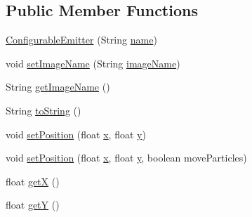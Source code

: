 \subsection*{Public Member Functions}
\begin{DoxyCompactItemize}
\item 
\mbox{\hyperlink{classorg_1_1newdawn_1_1slick_1_1particles_1_1_configurable_emitter_ad86bb9c713312612cc48cf2097a50196}{Configurable\+Emitter}} (String \mbox{\hyperlink{classorg_1_1newdawn_1_1slick_1_1particles_1_1_configurable_emitter_af63b15389d206c6318e14ff4bc909ac0}{name}})
\item 
void \mbox{\hyperlink{classorg_1_1newdawn_1_1slick_1_1particles_1_1_configurable_emitter_aa4bbab57939ae64a1a3fd83704df7065}{set\+Image\+Name}} (String \mbox{\hyperlink{classorg_1_1newdawn_1_1slick_1_1particles_1_1_configurable_emitter_a912693fc97b59864d7ee322ad4f6ec17}{image\+Name}})
\item 
String \mbox{\hyperlink{classorg_1_1newdawn_1_1slick_1_1particles_1_1_configurable_emitter_a7bf7f9630e0c8ca6a2903da8128d325f}{get\+Image\+Name}} ()
\item 
String \mbox{\hyperlink{classorg_1_1newdawn_1_1slick_1_1particles_1_1_configurable_emitter_a119908e4e5cb997b2b736d82dc21ada9}{to\+String}} ()
\item 
void \mbox{\hyperlink{classorg_1_1newdawn_1_1slick_1_1particles_1_1_configurable_emitter_a6c1e45f4ce5a92528636c6bb085c7370}{set\+Position}} (float \mbox{\hyperlink{classorg_1_1newdawn_1_1slick_1_1particles_1_1_configurable_emitter_a4198d77b5f4ee2b55be6e4732744b9cb}{x}}, float \mbox{\hyperlink{classorg_1_1newdawn_1_1slick_1_1particles_1_1_configurable_emitter_af1da7225bf1c489ad9a5323bf2a20ade}{y}})
\item 
void \mbox{\hyperlink{classorg_1_1newdawn_1_1slick_1_1particles_1_1_configurable_emitter_a8dab62d552f4f52590cb3a332c74540b}{set\+Position}} (float \mbox{\hyperlink{classorg_1_1newdawn_1_1slick_1_1particles_1_1_configurable_emitter_a4198d77b5f4ee2b55be6e4732744b9cb}{x}}, float \mbox{\hyperlink{classorg_1_1newdawn_1_1slick_1_1particles_1_1_configurable_emitter_af1da7225bf1c489ad9a5323bf2a20ade}{y}}, boolean move\+Particles)
\item 
float \mbox{\hyperlink{classorg_1_1newdawn_1_1slick_1_1particles_1_1_configurable_emitter_a726b720c6e526c8a7d165d6f111ef3db}{getX}} ()
\item 
float \mbox{\hyperlink{classorg_1_1newdawn_1_1slick_1_1particles_1_1_configurable_emitter_a1051b2582b827d13a89f2843b17fff5f}{getY}} ()
\item 

\end{DoxyCompactItemize}
